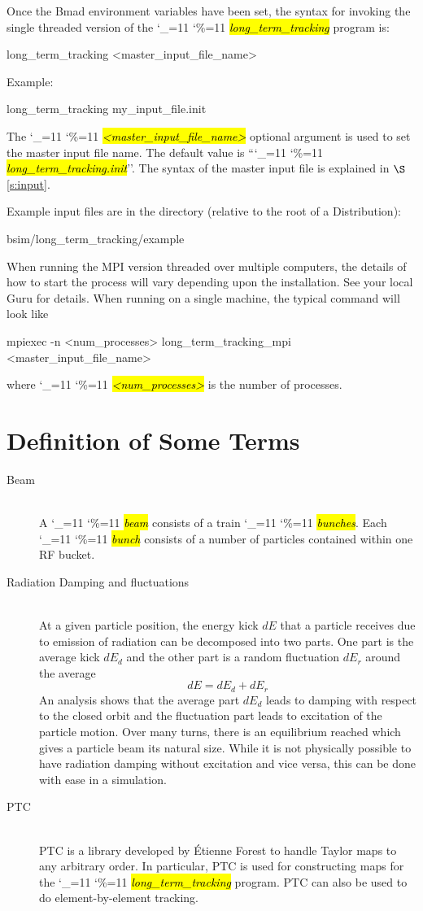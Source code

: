 \documentclass{hitec}
\newcommand\dottcmd[1]{\hl{\em#1}\endgroup}
\newcommand{\vn}{\begingroup\catcode`\_=11 \catcode`\%=11 \dottcmd}
\newcommand{\ltt}{\vn{long_term_tracking}\xspace}
\newcommand{\Newline}{\hfil \\}
\newcommand{\sref}[1]{$\S$\ref{#1}}
\newcommand{\Section}[1]{\section{#1}\vspace*{-1ex}}
\begin{document}
Once the Bmad environment variables have been set, the syntax for invoking the single threaded
version of the \ltt program is:
\begin{code}
long_term_tracking {<master_input_file_name>}
\end{code}
Example:
\begin{code}
long_term_tracking my_input_file.init
\end{code}
The \vn{<master_input_file_name>} optional argument is used to set the master input file name. The
default value is ``\vn{long_term_tracking.init}''. The syntax of the master input file is explained
in \sref{s:input}.

Example input files are in the directory (relative to the root of a Distribution):
\begin{code}
bsim/long_term_tracking/example
\end{code}

When running the MPI version threaded over multiple computers, the details of how to start the process will
vary depending upon the installation. See your local Guru for details. When running on a single machine, 
the typical command will look like
\begin{code}
mpiexec -n <num_processes> long_term_tracking_mpi {<master_input_file_name>}
\end{code}
where \vn{<num_processes>} is the number of processes. 

\Section{Definition of Some Terms}
\label{s:def}

\begin{description}
\item[Beam] \Newline
A \vn{beam} consists of a train \vn{bunches}. Each \vn{bunch} consists of a number of particles contained
within one RF bucket.
%
\item[Radiation Damping and fluctuations] \Newline
At a given particle position, the energy kick $dE$ that a particle receives due to emission of
radiation can be decomposed into two parts. One part is the average kick $dE_d$ and the other part
is a random fluctuation $dE_r$ around the average 
\begin{equation}
  dE = dE_d + dE_r
\end{equation}
An analysis shows that the average part $dE_d$ leads to damping with respect to the closed orbit and
the fluctuation part leads to excitation of the particle motion. Over many turns, there is an
equilibrium reached which gives a particle beam its natural size. While it is not physically
possible to have radiation damping without excitation and vice versa, this can be done with ease in
a simulation.
%
\item[PTC] \Newline
PTC is a library developed by \'Etienne Forest to handle Taylor maps to any arbitrary order. In
particular, PTC is used for constructing maps for the \vn{long_term_tracking} program. PTC can also
be used to do element-by-element tracking.
\end{description}
\end{document}
